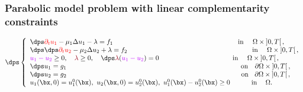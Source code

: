 


\begin{frame}
\frametitle{ Parabolic model problem with linear complementarity constraints}
\begin{equation*}
\dps \left\lbrace\begin{array}{llccc} 
\dps \textcolor{red}{\partial_t u_1} -\mu_1 \Delta u_1-\lambda =
f_1 \qquad \hspace{5.75 cm}\mbox{in} \ \quad \Omega \times \left]0,T\right[, \\ 
\dps \dps \textcolor{red}{\partial_t u_2} -\mu_2 \Delta u_2+\lambda =
f_2 \qquad \hspace{5.75 cm} \mbox{in} \ \quad \Omega \times \left]0,T\right[,\\ 
\textcolor{electricpurple}{u_1-u_2} \geq 0, \quad \textcolor{carmine}{\lambda} \geq 0, \quad \dps \textcolor{carmine}{\lambda} (\textcolor{electricpurple}{u_1-u_2}) =0 \hspace{3.8 cm}\mbox{in} \quad \
\Omega \times \left]0,T\right[,\\ 
\dps u_1=g_1 \qquad \hspace{8.3 cm} \mbox{on} \hspace{0.35 cm} \partial \Omega \times \left]0,T\right[,\\ 
\dps
u_2=g_2 \qquad \hspace{8.32 cm} \mbox{on} \hspace{0.32 cm} \partial \Omega \times \left]0,T\right[,\\
u_1(\bx,0) = u_1^0(\bx), \ u_2(\bx,0) = u_2^0(\bx), \ u_1^0(\bx)-u_2^0(\bx) \geq 0 \hspace{1.1 cm} \mbox{in}  \hspace{0.44 cm} \Omega.
\end{array}
\right.
\end{equation*}
\invisible<1>{
\textcolor{cadmiumgreen}{\textbf{Two possibilities to characterize the weak solution}}\\
\vspace{0.2 cm}
Recall $\Lambda=\left\{\chi\in L^2(\Omega), \: \textcolor{carmine}{\chi \geq 0} \: \mbox{a.e.} \ \mbox{in} \hspace{0.1 cm} \Omega\right\}$
\begin{itemize}
\item Saddle point formulation $(u_1,u_2,\lambda) \in L^2(0,T;H_{g_1}^1(\Omega)) \times L^2(0,T;H_{g_2}^1(\Omega)) \times L^2(0,T; \Lambda)$
\item Parabolic variational inequality: $\bu \in \Kgt$
\end{itemize}
\begin{equation*}
\Kgt \egaldef \left\{ \bv \in L^2(0,T;H_{g_1}^1(\Omega)) \times L^2(0,T;H_{g_2}^1(\Omega)), \ \bv(t) \in \Kg \quad \mbox{a.e in} \ ]0,T[\right\}
\end{equation*}
\invisible<2>{
}}
\end{frame}

